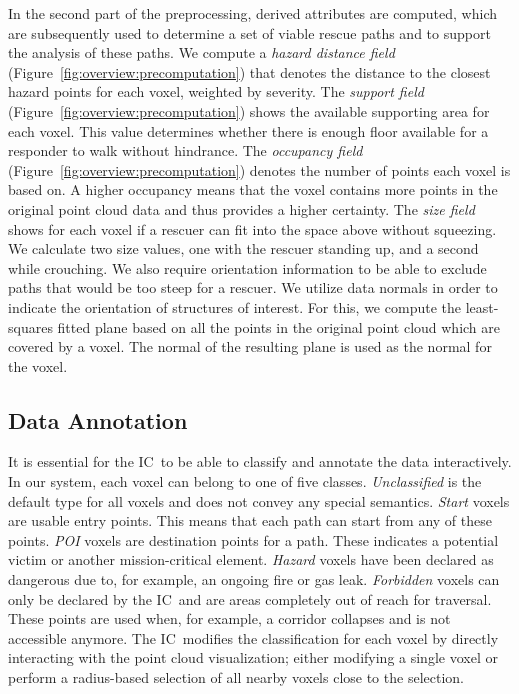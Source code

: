 \documentclass[conference,10pt,letter]{IEEEtran}
\def\IC{IC}
\begin{document}
 In the second part of the preprocessing, derived attributes are computed, which are subsequently used to determine a set of viable rescue paths and to support the analysis of these paths. We compute a \emph{hazard distance field} (Figure~\ref{fig:overview:precomputation}) that denotes the distance to the closest hazard points for each voxel, weighted by severity. The \emph{support field} (Figure~\ref{fig:overview:precomputation}) shows the available supporting area for each voxel. This value determines whether there is enough floor available for a responder to walk without hindrance. The \emph{occupancy field} (Figure~\ref{fig:overview:precomputation}) denotes the number of  points each voxel is based on. A higher occupancy means that the voxel contains more points in the original point cloud data and thus provides a higher certainty. The \emph{size field} shows for each voxel if a rescuer can fit into the space above without squeezing. We calculate two size values, one with the rescuer standing up, and a second while crouching. We also require orientation information to be able to exclude paths that would be too steep for a rescuer. We utilize data normals in order to indicate the orientation of structures of interest. For this, we compute the least-squares fitted plane based on all the points in the original point cloud which are covered by a voxel. The normal of the resulting plane is used as the normal for the voxel.


\subsection{Data Annotation} \label{sec:overview:annotation}
It is essential for the \IC\ to be able to classify and annotate the data interactively. In our system, each voxel can belong to one of five classes. \emph{Unclassified} is the default type for all voxels and does not convey any special semantics. \emph{Start} voxels are usable entry points. This means that each path can start from any of these points. \emph{POI} voxels are destination points for a path. These indicates a potential victim or another mission-critical element. \emph{Hazard} voxels have been declared as dangerous due to, for example, an ongoing fire or gas leak. \emph{Forbidden} voxels can only be declared by the \IC\ and are areas completely out of reach for traversal. These points are used when, for example, a corridor collapses and is not accessible anymore. The \IC\ modifies the classification for each voxel by directly interacting with the point cloud visualization; either modifying a single voxel or perform a radius-based selection of all nearby voxels close to the selection.
\end{document}
